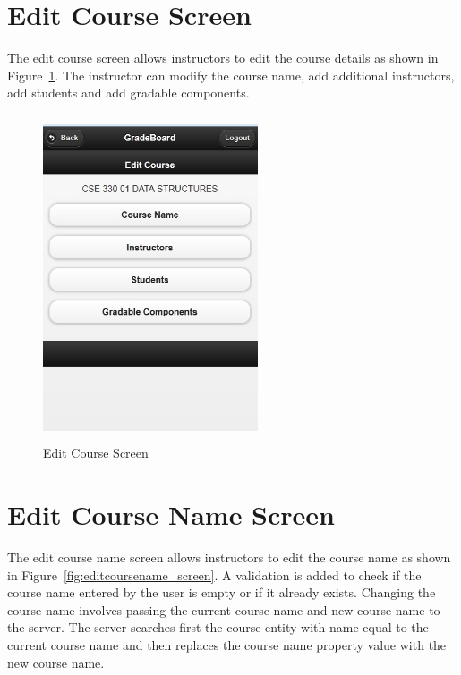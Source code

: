 \newpage
\section{Edit Course Screen}
The edit course screen allows instructors to edit the course details as shown in Figure~\ref{fig:editcourse_screen}. The instructor can modify the course name, add additional instructors, add students and add gradable components.

\vspace{3em}
\begin{figure}[H]
\begin{center}
\includegraphics[height=3.8in,width=2.5in]{images/editcourse_screen.jpg}
\caption{Edit Course Screen}
\label{fig:editcourse_screen}
\end{center}
\end{figure}

\newpage
\section{Edit Course Name Screen}
The edit course name screen allows instructors to edit the course name as shown in Figure~\ref{fig:editcoursename_screen}. A validation is added to check if the course name entered by the user is empty or if it already exists. Changing the course name involves passing the current course name and new course name to the server. The server searches first the course entity with name equal to the current course name and then replaces the course name property value with the new course name.


